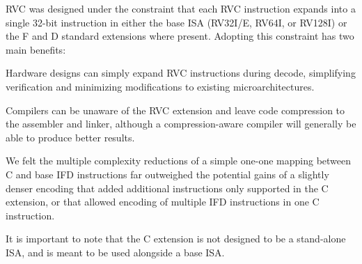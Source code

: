 RVC was designed under the constraint that each RVC instruction
expands into a single 32-bit instruction in either the base ISA
(RV32I/E, RV64I, or RV128I) or the F and D standard extensions where
present.  Adopting this constraint has two main benefits:

\begin{tightlist}
\item Hardware designs can simply expand RVC instructions during
  decode, simplifying verification and minimizing modifications to
  existing microarchitectures.
\item Compilers can be unaware of the RVC extension and leave code
  compression to the assembler and linker, although a
  compression-aware compiler will generally be able to produce better
  results.
\end{tightlist}

\begin{commentary}
We felt the multiple complexity reductions of a simple one-one mapping
between C and base IFD instructions far outweighed the potential gains
of a slightly denser encoding that added additional instructions only
supported in the C extension, or that allowed encoding of multiple IFD
instructions in one C instruction.
\end{commentary}

It is important to note that the C extension is not designed to be a
stand-alone ISA, and is meant to be used alongside a base ISA.

